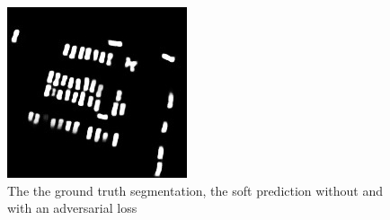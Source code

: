 \documentclass[aspectratio=1610]{beamer}
\begin{document}
\begin{frame}
\begin{figure}[H]
\endminipage\hfill
{}%
  \includegraphics[width=\linewidth]{gan_vs_class/gan_1}
\endminipage
\caption{The the ground truth segmentation, the soft prediction without and with an adversarial loss}
\end{figure}
\end{frame}
\end{document}
